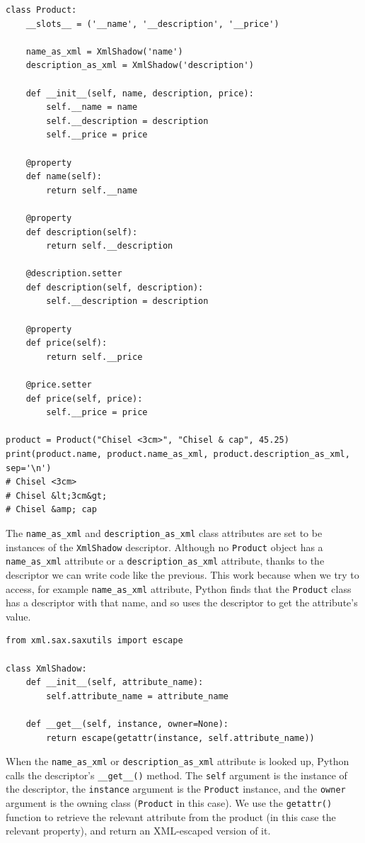 \begin{lstlisting}
class Product:
    __slots__ = ('__name', '__description', '__price')

    name_as_xml = XmlShadow('name')
    description_as_xml = XmlShadow('description')

    def __init__(self, name, description, price):
        self.__name = name
        self.__description = description
        self.__price = price

    @property
    def name(self):
        return self.__name

    @property
    def description(self):
        return self.__description

    @description.setter
    def description(self, description):
        self.__description = description

    @property
    def price(self):
        return self.__price

    @price.setter
    def price(self, price):
        self.__price = price

product = Product("Chisel <3cm>", "Chisel & cap", 45.25)
print(product.name, product.name_as_xml, product.description_as_xml, sep='\n')
# Chisel <3cm>
# Chisel &lt;3cm&gt;
# Chisel &amp; cap

\end{lstlisting}

The \verb|name_as_xml| and \verb|description_as_xml| class attributes are set to be instances of the \verb|XmlShadow| descriptor.
Although no \verb|Product| object has a \verb|name_as_xml| attribute or a \verb|description_as_xml| attribute, thanks to the descriptor we can write code like the previous.
This work because when we try to access, for example \verb|name_as_xml| attribute, Python finds that the \verb|Product| class has a descriptor with that name, and so uses the descriptor to get the attribute's value.

\begin{lstlisting}
from xml.sax.saxutils import escape

class XmlShadow:
    def __init__(self, attribute_name):
        self.attribute_name = attribute_name

    def __get__(self, instance, owner=None):
        return escape(getattr(instance, self.attribute_name))
\end{lstlisting}

When the \verb|name_as_xml| or \verb|description_as_xml| attribute is looked up, Python calls the descriptor's \verb|__get__()| method.
The \verb|self| argument is the instance of the descriptor, the \verb|instance| argument is the \verb|Product| instance, and the \verb|owner| argument is the owning class (\verb|Product| in this case).
We use the \verb|getattr()| function to retrieve the relevant attribute from the product (in this case the relevant property), and return an XML-escaped version of it.




